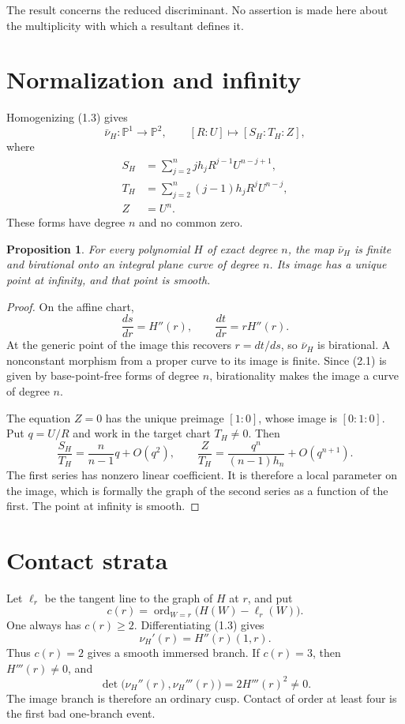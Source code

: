 \documentclass[11pt]{article}
\newtheorem{proposition}[theorem]{Proposition}
\newcommand{\Pone}{\mathbb P^1}
\begin{document}
The result concerns the reduced discriminant.  No assertion is made here
about the multiplicity with which a resultant defines it.

\section{Normalization and infinity}

Homogenizing (1.3) gives
\[
  \bar\nu_H:\Pone\longrightarrow\mathbb P^2,\qquad
  [R:U]\longmapsto[S_H:T_H:Z],                            \tag{2.1}
\]
where
\begin{align*}
 S_H&=\sum_{j=2}^n jh_jR^{j-1}U^{n-j+1},\\
 T_H&=\sum_{j=2}^n (j-1)h_jR^jU^{n-j},\\
 Z&=U^n.
\end{align*}
These forms have degree \(n\) and no common zero.

\begin{proposition}\label{prop:normalization}
For every polynomial \(H\) of exact degree \(n\), the map
\(\bar\nu_H\) is finite and birational onto an integral plane curve of
degree \(n\).  Its image has a unique point at infinity, and that point is
smooth.
\end{proposition}

\begin{proof}
On the affine chart,
\[
  \frac{ds}{dr}=H''(r),\qquad
  \frac{dt}{dr}=rH''(r).
\]
At the generic point of the image this recovers \(r=dt/ds\), so
\(\bar\nu_H\) is birational.  A nonconstant morphism from a proper curve to
its image is finite.  Since (2.1) is given by base-point-free forms of
degree \(n\), birationality makes the image a curve of degree \(n\).

The equation \(Z=0\) has the unique preimage \([1:0]\), whose image is
\([0:1:0]\).  Put \(q=U/R\) and work in the target chart \(T_H\neq0\).
Then
\[
  \frac{S_H}{T_H}=\frac{n}{n-1}q+O(q^2),\qquad
  \frac{Z}{T_H}=\frac{q^n}{(n-1)h_n}+O(q^{n+1}).          \tag{2.2}
\]
The first series has nonzero linear coefficient.  It is therefore a local
parameter on the image, which is formally the graph of the second series as
a function of the first.  The point at infinity is smooth.
\end{proof}

\section{Contact strata}

Let \(\ell_r\) be the tangent line to the graph of \(H\) at \(r\), and put
\[
  c(r)=\operatorname{ord}_{W=r}\bigl(H(W)-\ell_r(W)\bigr).
\]
One always has \(c(r)\geq2\).  Differentiating (1.3) gives
\[
  \nu_H'(r)=H''(r)(1,r).                                 \tag{3.1}
\]
Thus \(c(r)=2\) gives a smooth immersed branch.  If \(c(r)=3\), then
\(H'''(r)\neq0\), and
\[
  \det\bigl(\nu_H''(r),\nu_H'''(r)\bigr)
  =2H'''(r)^2\neq0.                                      \tag{3.2}
\]
The image branch is therefore an ordinary cusp.  Contact of order at least
four is the first bad one-branch event.
\end{document}
